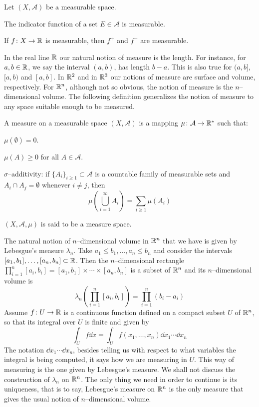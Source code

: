 \begin{prop}
	Let $(X, \mathcal{A})$ be a measurable space.
	\begin{enumerateprop}
		\item The indicator function of a set $E \in \mathcal{A}$ is measurable.
		\item If $f \colon X \rightarrow \mathbb{R}$ is measurable, then $f^+$ and $f^-$ are measurable.
	\end{enumerateprop}
\end{prop}

In the real line $\mathbb{R}$ our natural notion of measure is the length. For
instance, for $a, b \in \mathbb{R}$, we say the interval $(a, b)$, has length $b -
a$. This is also true for $(a, b]$, $[a, b)$ and $[a,b]$. In $\mathbb{R}^2$ and in
$\mathbb{R}^3$ our notions of measure are surface and volume, respectively. For
$\mathbb{R}^n$, although not so obvious, the notion of measure is the
$n$--dimensional volume. The following definition generalizes the notion of
measure to any space suitable enough to be measured.

\begin{definition*}
	A measure on a measurable space $(X, \mathcal{A})$ is a mapping $\mu \colon
	\mathcal{A} \rightarrow \mathbb{R}^\ast$ such that:
	\begin{enumeratedef}
		\item $\mu(\emptyset) = 0$.
		\item $\mu(A) \geq 0$ for all $A \in \mathcal{A}$.
		\item $\sigma$--additivity: if $\{ A_i \}_{i \geq 1} \subset \mathcal{A}$ is a countable
		family of measurable sets and $A_i \cap A_j = \emptyset$ whenever $i \neq j$, then
		\[
			\mu\left( \displaystyle\bigcup_{i = 1}^\infty A_i \right) = \sum_{i \geq 1} \mu(A_i)	
		\]
	\end{enumeratedef}
	$(X, \mathcal{A}, \mu)$ is said to be a measure space.
\end{definition*}

The natural notion of $n$--dimensional volume in $\mathbb{R}^n$ that we have is given
by Lebesgue's measure $\lambda_n$. Take $a_1 \leq b_1, \ldots, a_n \leq b_n$ and
consider the intervals $[a_1, b_1], \ldots, [a_n, b_n] \subset \mathbb{R}$. Then the
$n$--dimensional rectangle $\prod_{i = 1}^n [a_i, b_i] = [a_1, b_1] \times
\cdots \times [a_n, b_n]$ is a subset of $\mathbb{R}^n$ and its $n$--dimensional
volume is
\[
	\lambda_n\left( \prod_{i = 1}^n [a_i, b_i] \right) = \prod_{i=1}^n (b_i - a_i)
\]
Assume $f \colon U \rightarrow \mathbb{R}$ is a continuous function defined on a
compact subset $U$ of $\mathbb{R}^n$, so that its integral over $U$ is finite and given by
\[
	\int_U f \dd{x} = \int_U f(x_1, \ldots, x_n) \dd{x_1} \cdots \dd{x_n}	
\]
The notation $\dd{x_1} \cdots \dd{x_n}$, besides telling us with respect to what
variables the integral is being computed, it says how we are measuring in $U$.
This way of measuring is the one given by Lebesgue's measure. We shall not
discuss the construction of $\lambda_n$ on $\mathbb{R}^n$. The only thing we need in
order to continue is its uniqueness, that is to say, Lebesgue's measure on
$\mathbb{R}^n$ is the only measure that gives the usual notion of $n$--dimensional
volume.

